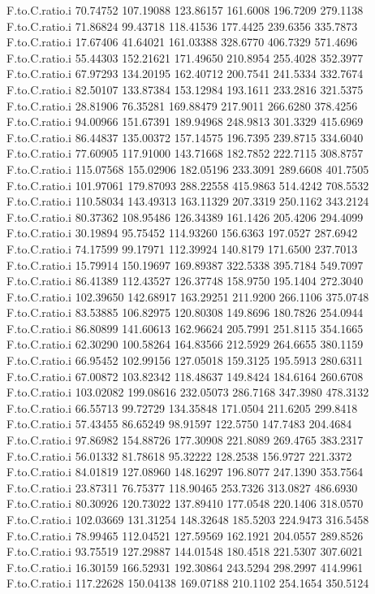 \documentclass[11pt]{article} %
\begin{document}
\begin{Schunk}
\begin{Soutput}
F.to.C.ratio.i  70.74752 107.19088 123.86157 161.6008 196.7209 279.1138
F.to.C.ratio.i  71.86824  99.43718 118.41536 177.4425 239.6356 335.7873
F.to.C.ratio.i  17.67406  41.64021 161.03388 328.6770 406.7329 571.4696
F.to.C.ratio.i  55.44303 152.21621 171.49650 210.8954 255.4028 352.3977
F.to.C.ratio.i  67.97293 134.20195 162.40712 200.7541 241.5334 332.7674
F.to.C.ratio.i  82.50107 133.87384 153.12984 193.1611 233.2816 321.5375
F.to.C.ratio.i  28.81906  76.35281 169.88479 217.9011 266.6280 378.4256
F.to.C.ratio.i  94.00966 151.67391 189.94968 248.9813 301.3329 415.6969
F.to.C.ratio.i  86.44837 135.00372 157.14575 196.7395 239.8715 334.6040
F.to.C.ratio.i  77.60905 117.91000 143.71668 182.7852 222.7115 308.8757
F.to.C.ratio.i 115.07568 155.02906 182.05196 233.3091 289.6608 401.7505
F.to.C.ratio.i 101.97061 179.87093 288.22558 415.9863 514.4242 708.5532
F.to.C.ratio.i 110.58034 143.49313 163.11329 207.3319 250.1162 343.2124
F.to.C.ratio.i  80.37362 108.95486 126.34389 161.1426 205.4206 294.4099
F.to.C.ratio.i  30.19894  95.75452 114.93260 156.6363 197.0527 287.6942
F.to.C.ratio.i  74.17599  99.17971 112.39924 140.8179 171.6500 237.7013
F.to.C.ratio.i  15.79914 150.19697 169.89387 322.5338 395.7184 549.7097
F.to.C.ratio.i  86.41389 112.43527 126.37748 158.9750 195.1404 272.3040
F.to.C.ratio.i 102.39650 142.68917 163.29251 211.9200 266.1106 375.0748
F.to.C.ratio.i  83.53885 106.82975 120.80308 149.8696 180.7826 254.0944
F.to.C.ratio.i  86.80899 141.60613 162.96624 205.7991 251.8115 354.1665
F.to.C.ratio.i  62.30290 100.58264 164.83566 212.5929 264.6655 380.1159
F.to.C.ratio.i  66.95452 102.99156 127.05018 159.3125 195.5913 280.6311
F.to.C.ratio.i  67.00872 103.82342 118.48637 149.8424 184.6164 260.6708
F.to.C.ratio.i 103.02082 199.08616 232.05073 286.7168 347.3980 478.3132
F.to.C.ratio.i  66.55713  99.72729 134.35848 171.0504 211.6205 299.8418
F.to.C.ratio.i  57.43455  86.65249  98.91597 122.5750 147.7483 204.4684
F.to.C.ratio.i  97.86982 154.88726 177.30908 221.8089 269.4765 383.2317
F.to.C.ratio.i  56.01332  81.78618  95.32222 128.2538 156.9727 221.3372
F.to.C.ratio.i  84.01819 127.08960 148.16297 196.8077 247.1390 353.7564
F.to.C.ratio.i  23.87311  76.75377 118.90465 253.7326 313.0827 486.6930
F.to.C.ratio.i  80.30926 120.73022 137.89410 177.0548 220.1406 318.0570
F.to.C.ratio.i 102.03669 131.31254 148.32648 185.5203 224.9473 316.5458
F.to.C.ratio.i  78.99465 112.04521 127.59569 162.1921 204.0557 289.8526
F.to.C.ratio.i  93.75519 127.29887 144.01548 180.4518 221.5307 307.6021
F.to.C.ratio.i  16.30159 166.52931 192.30864 243.5294 298.2997 414.9961
F.to.C.ratio.i 117.22628 150.04138 169.07188 210.1102 254.1654 350.5124

\end{Soutput}
\end{Schunk}
\end{document}
